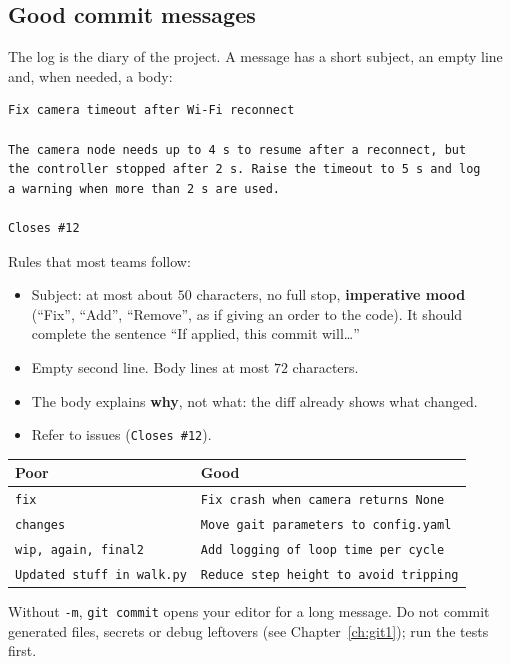 \subsection*{Good commit messages}
The log is the diary of the project. A message has a short subject, an empty line and, when needed, a body:
\begin{verbatim}
Fix camera timeout after Wi-Fi reconnect

The camera node needs up to 4 s to resume after a reconnect, but
the controller stopped after 2 s. Raise the timeout to 5 s and log
a warning when more than 2 s are used.

Closes #12
\end{verbatim}
Rules that most teams follow:
\begin{itemize}[nosep]
  \item Subject: at most about $50$ characters, no full stop, \textbf{imperative mood} (``Fix'', ``Add'', ``Remove'', as if giving an order to the code). It should complete the sentence ``If applied, this commit will\dots''
  \item Empty second line. Body lines at most $72$ characters.
  \item The body explains \textbf{why}, not what: the diff already shows what changed.
  \item Refer to issues (\texttt{Closes \#12}).
\end{itemize}
\begin{center}
\renewcommand{\arraystretch}{1.25}
\begin{tabular}{p{6.0cm}p{7.2cm}}
\textbf{Poor} & \textbf{Good}\\ \hline
\texttt{fix} & \texttt{Fix crash when camera returns None}\\
\texttt{changes} & \texttt{Move gait parameters to config.yaml}\\
\texttt{wip, again, final2} & \texttt{Add logging of loop time per cycle}\\
\texttt{Updated stuff in walk.py} & \texttt{Reduce step height to avoid tripping}\\
\end{tabular}
\end{center}
Without \texttt{-m}, \texttt{git commit} opens your editor for a long message. Do not commit generated files, secrets or debug leftovers (see Chapter~\ref{ch:git1}); run the tests first.

